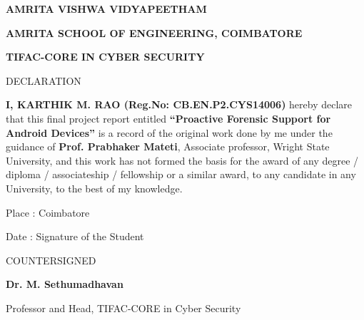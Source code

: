 \clearpage




\begin{center}
\large
\textbf{AMRITA VISHWA VIDYAPEETHAM}

\normalsize
\textbf{AMRITA SCHOOL OF ENGINEERING, COIMBATORE}

\textbf{TIFAC-CORE IN CYBER SECURITY}

\vspace*{42pt}
\normalsize
DECLARATION

\end{center}

\vspace*{32pt}


\begin{sloppypar}
\noindent
\textbf{I, KARTHIK M. RAO (Reg.No: CB.EN.P2.CYS14006)} hereby declare that this final project report entitled \textbf{``Proactive Forensic Support for Android Devices''} is a record of the original work done by me under the guidance of \textbf{Prof. Prabhaker Mateti}, Associate professor, Wright State University, and this work has not formed the basis for the award of any degree / diploma / associateship / fellowship or a similar award, to any candidate in any University, to the best of my knowledge.
\end{sloppypar}

\vspace*{42pt}
\begin{flushleft}
\noindent
Place : Coimbatore

\vspace*{10pt}
\noindent
Date :
\hspace*{250pt}
Signature of the Student
\end{flushleft}

\begin{center}

\vspace*{70pt}
COUNTERSIGNED

\vspace*{50pt}
\textbf{Dr. M. Sethumadhavan}

Professor and Head, TIFAC-CORE in Cyber Security

\end{center}
 

\clearpage %
